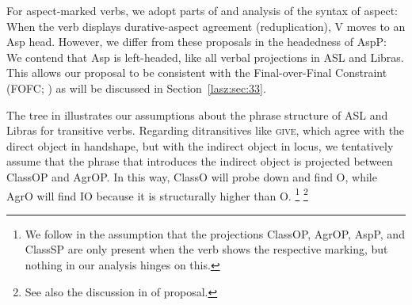 \documentclass[output=paper]{langscibook}
\begin{document}
For aspect-marked verbs, we adopt parts of 
and  analysis of the syntax of aspect: When the verb
displays durative-aspect agreement (reduplication), V moves to an Asp
head. However, we differ from these proposals in the headedness of
AspP: We contend that Asp is left-headed, like all verbal projections in
ASL and Libras. This allows our proposal to be consistent with the
Final-over-Final Constraint (FOFC; \citealp{BiberauerHR.2014,SheehanBRH.2017}) 
as will be discussed in Section~\ref{lasz:sec:33}.

The tree in  illustrates our assumptions about the phrase
structure of ASL and Libras for transitive verbs. Regarding
ditransitives like \textsc{give}, which agree with the direct object in
handshape, but with the indirect object in locus, we tentatively assume
that the phrase that introduces the indirect object is projected between 
ClassOP and AgrOP. In this way, ClassO will probe down and find O,
while AgrO will find IO because it is structurally higher than O.%
\footnote{%
    We follow \citet{Quadros.etal.2004} in the assumption that the projections
    ClassOP, AgrOP, AspP, and ClassSP are only present when the verb shows the respective marking,
    but nothing in our analysis hinges on this.
}%
\footnote{%
    See also the discussion in \citet{Pfau.etal.2018} of  proposal.
}
\end{document}
